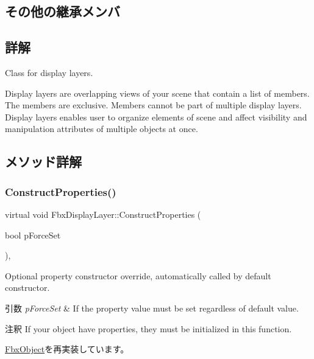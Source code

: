 \subsection*{その他の継承メンバ}


\subsection{詳解}
Class for display layers.

Display layers are overlapping views of your scene that contain a list of members. The members are exclusive. Members cannot be part of multiple display layers. Display layers enables user to organize elements of scene and affect visibility and manipulation attributes of multiple objects at once. 

\subsection{メソッド詳解}
\mbox{\label{class_fbx_display_layer_a5712965749ccf41c758913d2a0ebc0c9}} 
\subsubsection{\texorpdfstring{Construct\+Properties()}{ConstructProperties()}}
{\footnotesize\ttfamily virtual void Fbx\+Display\+Layer\+::\+Construct\+Properties (\begin{DoxyParamCaption}\item[{bool}]{p\+Force\+Set }\end{DoxyParamCaption})\hspace{0.3cm}{\ttfamily [protected]}, {\ttfamily [virtual]}}

Optional property constructor override, automatically called by default constructor. 
\begin{DoxyParams}{引数}
{\em p\+Force\+Set} & If the property value must be set regardless of default value. \\
\hline
\end{DoxyParams}
\begin{DoxyRemark}{注釈}
If your object have properties, they must be initialized in this function. 
\end{DoxyRemark}


\hyperlink{class_fbx_object_ad44f814323dc1b5e78bff1bfc608b4bb}{Fbx\+Object}を再実装しています。




